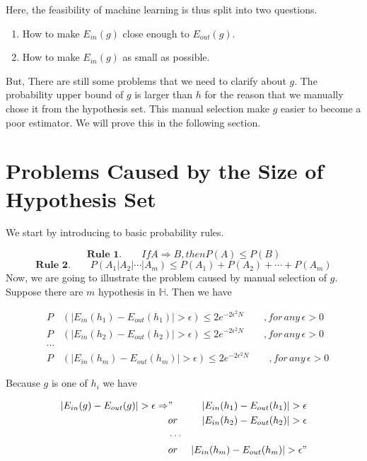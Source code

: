 \documentclass[11pt]{article}
\begin{document}
Here, the feasibility of machine learning is thus split into two questions.
\begin{enumerate}
\item How to make $E_{in}(g)$ close enough to $E_{out}(g)$.\\
\item How to make $E_{in}(g)$ as small as possible.
\end{enumerate}

But, There are still some problems that we need to clarify about $g$. The probability upper bound of $g$ is larger than $h$ for the reason that we manually chose it from the hypothesis set. This manual selection make $g$ easier to become a poor estimator. We will prove this in the following section.

\section{Problems Caused by the Size of Hypothesis Set}
We start by introducing to basic probability rules.

$$\textbf{Rule 1.}\qquad If A \Rightarrow B, then P(A) \leq P(B)$$
$$\textbf{Rule 2.}\qquad P(A_1|A_2|\cdots |A_m) \leq P(A_1) + P(A_2) + \cdots + P(A_m)$$
Now, we are going to illustrate the problem caused by manual selection of $g$. Suppose there are $m$ hypothesis in $\mathbb{H}$. Then we have

\begin{eqnarray*}
&P&\left(|E_{in}(h_1) - E_{out}(h_1)| > \epsilon\right) \leq 2e^{-2\epsilon^2 N} \qquad, for \, any \, \epsilon > 0\\
&P&\left(|E_{in}(h_2) - E_{out}(h_2)| > \epsilon\right) \leq 2e^{-2\epsilon^2 N} \qquad, for \, any \, \epsilon > 0\\
&\cdots& \\
&P&\left(|E_{in}(h_m) - E_{out}(h_m)| > \epsilon\right) \leq 2e^{-2\epsilon^2 N} \qquad, for \, any \, \epsilon > 0
\end{eqnarray*}

Because $g$ is one of $h_i$ we have

\begin{eqnarray*}
|E_{in}(g) - E_{out}(g)| > \epsilon \Rightarrow &"& |E_{in}(h_1) - E_{out}(h_1)| > \epsilon\\
&or& |E_{in}(h_2) - E_{out}(h_2)| > \epsilon\\
&\cdots& \\
&or& |E_{in}(h_m) - E_{out}(h_m)| > \epsilon "
\end{eqnarray*}
\end{document}
